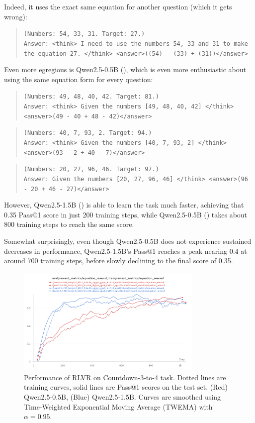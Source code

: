 \documentclass{article} %
\theoremstyle{definition}
\begin{document}
Indeed, it uses the exact same equation for another question (which it gets wrong):
\begin{quote}
    \texttt{(Numbers: 54, 33, 31. Target: 27.)} \\
    \texttt{Answer: <think> I need to use the numbers 54, 33 and 31 to make the equation 27. </think>
    <answer>((54) - (33) + (31))</answer>}
\end{quote}

Even more egregious is Qwen2.5-0.5B (\cite{Qwen-et-al-2025}), which is even more enthusiastic about using the 
same equation form for every question:
\begin{quote}
    \texttt{(Numbers: 49, 48, 40, 42. Target: 81.)} \\
    \texttt{Answer: <think> Given the numbers [49, 48, 40, 42] </think>
<answer>(49 - 40 + 48 - 42)</answer>}
\end{quote}
\begin{quote}
    \texttt{(Numbers: 40, 7, 93, 2. Target: 94.)} \\
    \texttt{Answer: <think> Given the numbers [40, 7, 93, 2] </think>
    <answer>(93 - 2 + 40 - 7)</answer>}
\end{quote}
\begin{quote}
    \texttt{(Numbers: 20, 27, 96, 46. Target: 97.)} \\
    \texttt{Answer: Given the numbers [20, 27, 96, 46] </think>
    <answer>(96 - 20 + 46 - 27)</answer>}
\end{quote}


However, Qwen2.5-1.5B (\cite{Qwen-et-al-2025}) is able to learn the task much faster,
achieving that 0.35 Pass@1 score in just 200 training steps, 
while Qwen2.5-0.5B (\cite{Qwen-et-al-2025}) takes about 800 training steps to reach the same score.

Somewhat surprisingly, even though Qwen2.5-0.5B does not experience
sustained decreases in performance, Qwen2.5-1.5B's Pass@1 reaches a peak
nearing 0.4 at around 700 training steps, before slowly declining to the final score of 0.35.

\begin{figure}
    \centering
    \includegraphics[width=0.8\textwidth]{images/Countdown.png}
    \caption{
        Performance of RLVR on Countdown-3-to-4 task. 
        Dotted lines are training curves,
        solid lines are Pass@1 scores on the test set.
        (Red) Qwen2.5-0.5B, (Blue) Qwen2.5-1.5B.
        Curves are smoothed using Time-Weighted Exponential Moving Average (TWEMA) with $\alpha = 0.95$.
    }
    \label{fig:countdown-results}
\end{figure} 
\end{document}
